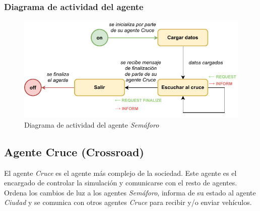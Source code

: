 \subsubsection{Diagrama de actividad del agente}
\begin{figure}[H]
    \centering
    \includegraphics[width=1\linewidth]{text/image/DAgen-DA-TrafficLight.pdf}
    \caption{Diagrama de actividad del agente \textit{Semáforo}}
    \label{fig:da_agente_semaforo}
\end{figure}

\subsection{Agente Cruce (Crossroad)}
El agente \textit{Cruce} es el agente más complejo de la sociedad. Este agente es el encargado de controlar la simulación y comunicarse con el resto de agentes. Ordena los cambios de luz a los agentes \textit{Semáforo}, informa de su estado al agente \textit{Ciudad} y se comunica con otros agentes \textit{Cruce} para recibir y/o enviar vehículos.

